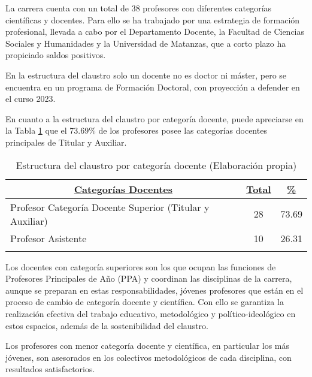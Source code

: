La carrera cuenta con un total de 38 profesores con diferentes categorías científicas y docentes. Para ello se ha trabajado por una estrategia de formación profesional, llevada a cabo por el Departamento Docente, la Facultad de Ciencias Sociales y Humanidades y la Universidad de Matanzas, que a corto plazo ha propiciado saldos positivos. 

En la estructura del claustro solo un docente no es doctor ni máster, pero se encuentra en un programa de Formación Doctoral, con proyección a defender en el curso 2023. 

En cuanto a la estructura del claustro por categoría docente, puede apreciarse en la Tabla \ref{categorias_docentes} que el 73.69\% de los profesores posee las categorías docentes principales de Titular y Auxiliar.

\begin{longtable}{|p{12cm}|c|c|}
	\hline
	\multicolumn{1}{|c|}{ \underline{\textbf{Categorías Docentes}}} & \underline{\textbf{Total}} & \underline{\textbf{\%}} \\ \hline
	Profesor Categoría Docente Superior (Titular y Auxiliar) &28  & 73.69 \\ \hline
	Profesor Asistente & 10 & 26.31 \\ \hline
	\caption{Estructura del claustro por categoría docente (Elaboración propia)}
	\label{categorias_docentes}
\end{longtable}

Los docentes con categoría superiores son los que ocupan las funciones de Profesores Principales de Año (PPA) y coordinan las disciplinas de la carrera, aunque se preparan en estas responsabilidades, jóvenes profesores que están en el proceso de cambio de categoría docente y científica. Con ello se garantiza la realización efectiva del trabajo educativo, metodológico y político-ideológico en estos espacios, además de la sostenibilidad del claustro.

Los profesores con menor categoría docente y científica, en particular los más jóvenes, son asesorados en los colectivos metodológicos de cada disciplina, con resultados satisfactorios.